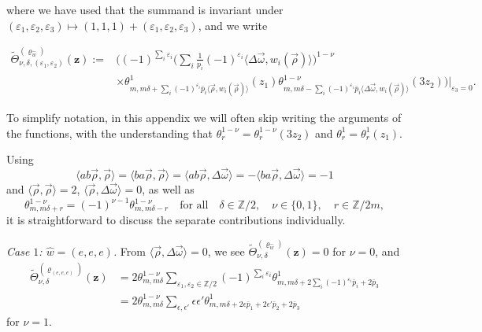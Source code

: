 \documentclass[10pt,a4paper]{amsart}
\newcommand{\ZZ}{\mathbb{Z}}
\def\bos{\varrho}
\theoremstyle{definition}
\numberwithin{equation}{section}
\begin{document}
\noindent where we have used that the summand is invariant under $(\varepsilon_1,\varepsilon_2,\varepsilon_3)\mapsto (1,1,1)+(\varepsilon_1,\varepsilon_2,\varepsilon_3)$, and we write

\begin{align*}
\tilde \Theta_{\nu,\delta,(\varepsilon_1,\varepsilon_2)}^{(\bos_{\hat{w}})}(\mathbf{z}) :={}&
\biggl((-1)^{\sum_{i}\varepsilon_i}
{\bigg(\sum_{i}\tfrac{1}{p_i} (-1)^{\varepsilon_i} \langle \Delta\vec\omega, w_i(\vec{\rho})\rangle\bigg)^{1-\nu}} \\
&\times\theta^1_{m,m\delta + \sum_{i} (-1)^{\varepsilon_i} \bar{p}_i \langle\vec{\rho}, w_i(\vec{\rho})\rangle} ({z_1}) \theta^{1-\nu}_{m,m\delta - \sum_{i} (-1)^{\varepsilon_i} \bar{p}_i \langle \Delta\vec\omega, w_i(\vec{\rho}) \rangle}({3z_2})\Bigr)\lvert_{\varepsilon_3=0}.
\end{align*}

To simplify notation, in this appendix we will often skip writing the arguments of the functions, with the understanding that $ \theta^{1-\nu}_r = \theta^{1-\nu}_r\left({3z_2}\right)$ and $\theta^1_r=\theta^1_r\left({z_1}\right)$.

Using
\[
\langle ab\vec\rho,\vec\rho \rangle= \langle ba\vec\rho,\vec\rho \rangle = \langle ab\vec\rho,\Delta\vec\omega \rangle
= -\langle ba\vec\rho,\Delta\vec\omega \rangle =-1
\]
and $\langle \vec\rho,\vec\rho \rangle = 2$, $\langle \vec\rho,\Delta\vec\omega \rangle =0$, as well as
\[
\theta^{1-\nu}_{m,m\delta+r}= (-1)^{\nu-1}\theta^{1-\nu}_{m,m\delta-r}\quad
\text{for all}\quad\delta\in \ZZ/2, \quad\nu\in \{0,1\},\quad r\in \ZZ/2m,
\]
it is straightforward to discuss the separate contributions individually.

{\em Case $1$: $\hat w=(e,e,e)$.}
From $\langle \vec\rho,\Delta\vec\omega \rangle =0$,
we see $ \tilde \Theta_{\nu,\delta}^{(\bos_{\hat{w}})}(\mathbf{z})=0$ for $\nu=0$, and
\begin{align*}
\tilde\Theta_{\nu,\delta}^{(\bos_{(e,e,e)})}(\mathbf{z})&={2}\theta^{1-\nu}_{m,m\delta } \sum_{\varepsilon_1,\varepsilon_2\in \ZZ/2} (-1)^{\sum_{i}\varepsilon_i}
\theta^1_{m,m\delta + 2 \sum_{i} {(-1)^{\varepsilon_i}\bar{p}_i} + 2\bar p_3}
\\
&={2} \theta^{1-\nu}_{m,m\delta } \sum_{\epsilon, \epsilon'}\epsilon\epsilon'
\theta^1_{m,m\delta + 2 \epsilon \bar p_1 + 2 \epsilon' \bar p_2 + 2\bar p_3}
\end{align*}
for $\nu=1$.
\end{document}
